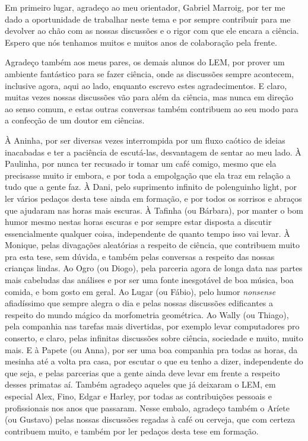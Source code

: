 \onehalfspacing

Em primeiro lugar, agradeço ao meu orientador, Gabriel Marroig, por ter me dado a oportunidade de trabalhar neste tema e por sempre contribuir para me devolver ao chão com as nossas discussões e o rigor com que ele encara a ciência. 
Espero que nós tenhamos muitos e muitos anos de colaboração pela frente.

Agradeço também aos meus pares, os demais alunos do LEM, por prover um ambiente fantástico para se fazer ciência, onde as discussões sempre acontecem, inclusive agora, aqui ao lado, enquanto escrevo estes agradecimentos. 
E claro, muitas vezes nossas discussões vão para além da ciência, mas nunca em direção ao senso comum, e estas outras conversas também contribuem ao seu modo para a confecção de um doutor em ciências.

À Aninha, por ser diversas vezes interrompida por um fluxo caótico de ideias inacabadas e ter a paciência de escutá-las, desvantagem de sentar ao meu lado.
À Paulinha, por nunca ter recusado ir tomar um café comigo, mesmo que ela precisasse muito ir embora, e por toda a empolgação que ela traz em relação a tudo que a gente faz.
À Dani, pelo suprimento infinito de polenguinho light, por ler vários pedaços desta tese ainda em formação, e por todos os sorrisos e abraços que ajudaram nas horas mais escuras.
À Tafinha (ou Bárbara), por manter o bom humor mesmo nestas horas escuras e por sempre estar disposta a discutir essencialmente qualquer coisa, independente de quanto tempo isso vai levar.
À Monique, pelas divagações aleatórias a respeito de ciência, que contribuem muito pra esta tese, sem dúvida, e também pelas conversas a respeito das nossas crianças lindas.
Ao Ogro (ou Diogo), pela parceria agora de longa data nas partes mais cabeludas das análises e por ser uma fonte inesgotável de boa música, boa comida, e bom gosto em geral.
Ao Lugar (ou Fábio), pelo humor \emph{nonsense} afiadíssimo que sempre alegra o dia e pelas nossas discussões edificantes a respeito do mundo mágico da morfometria geométrica.
Ao Wally (ou Thiago), pela companhia nas tarefas mais divertidas, por exemplo levar computadores pro conserto, e claro, pelas infinitas discussões sobre ciência, sociedade e muito, muito mais.
E à Papete (ou Anna), por ser uma boa companhia pra todas as horas, da mesinha até a volta pra casa, por escutar o que eu tenho a dizer, independente do que seja, e pelas parcerias que a gente ainda deve levar em frente a respeito desses primatas aí.
Também agradeço aqueles que já deixaram o LEM, em especial Alex, Fino, Edgar e Harley, por todas as contribuições pessoais e profissionais nos anos que passaram.
Nesse embalo, agradeço também o Aríete (ou Gustavo) pelas nossas discussões regadas à café ou cerveja, que com certeza contribuem muito, e também por ler pedaços desta tese em formação.

